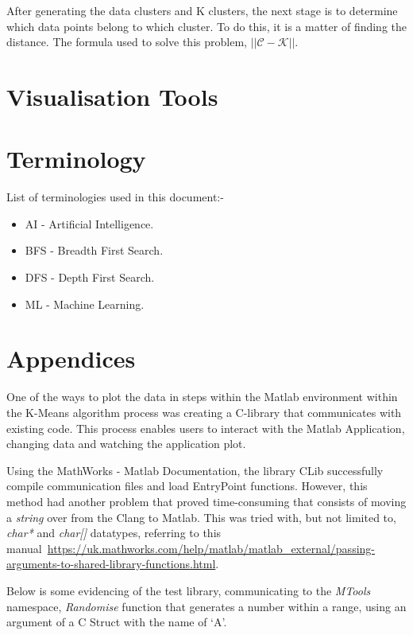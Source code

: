 \documentclass[conference]{IEEEtran}
\begin{document}
      After generating the data clusters and K clusters, the next stage is to determine which data points belong to which cluster. To do this, it is a matter of finding the distance. The formula used to solve this problem, $\left||\mathcal{C} - \mathcal{K}\right||$.
    \section{Visualisation Tools}

    \section{Terminology}
      List of terminologies used in this document:-
      \begin{itemize}
        \item AI - Artificial Intelligence.
        \item BFS - Breadth First Search.
        \item DFS - Depth First Search.
        \item ML - Machine Learning.
      \end{itemize}

    \section{Appendices}
      One of the ways to plot the data in steps within the Matlab environment within the K-Means algorithm process was creating a C-library that communicates with existing code. This process enables users to interact with the Matlab Application, changing data and watching the application plot. 
      
      Using the MathWorks - Matlab Documentation, the library CLib successfully compile communication files and load EntryPoint functions. However, this method had another problem that proved time-consuming that consists of moving a \textit{string} over from the Clang to Matlab. This was tried with, but not limited to, \textit{char*} and \textit{char[]} datatypes, referring to this manual~\url{https://uk.mathworks.com/help/matlab/matlab_external/passing-arguments-to-shared-library-functions.html}. 

      Below is some evidencing of the test library, communicating to the \textit{MTools} namespace, \textit{Randomise} function that generates a number within a range, using an argument of a C Struct with the name of `A'.
      
\end{document}
